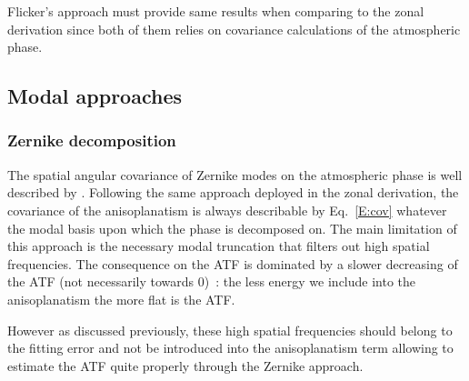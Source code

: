 \documentclass[12pt]{article}
\begin{document}
Flicker's approach must provide same results when comparing to the zonal derivation since both of them relies on covariance calculations of the atmospheric phase.

\subsection{Modal approaches}
\subsubsection{Zernike decomposition}

The spatial angular covariance of Zernike modes on the atmospheric phase is well described by \cite{Chassat1989}. Following the same approach deployed in the zonal derivation, the covariance of the anisoplanatism is always describable by Eq.~\ref{E:cov} whatever the modal basis upon which the phase is decomposed on. The main limitation of this approach is the necessary modal truncation that filters out high spatial frequencies. The consequence on the ATF is dominated by a slower decreasing of the ATF (not necessarily towards 0)~: the less energy we include into the anisoplanatism the more flat is the ATF.

However as discussed previously, these high spatial frequencies should belong to the fitting error and not be introduced into the anisoplanatism term allowing to estimate the ATF quite properly through the Zernike approach.
 
\begin{center}
\end{center}
\end{document}
